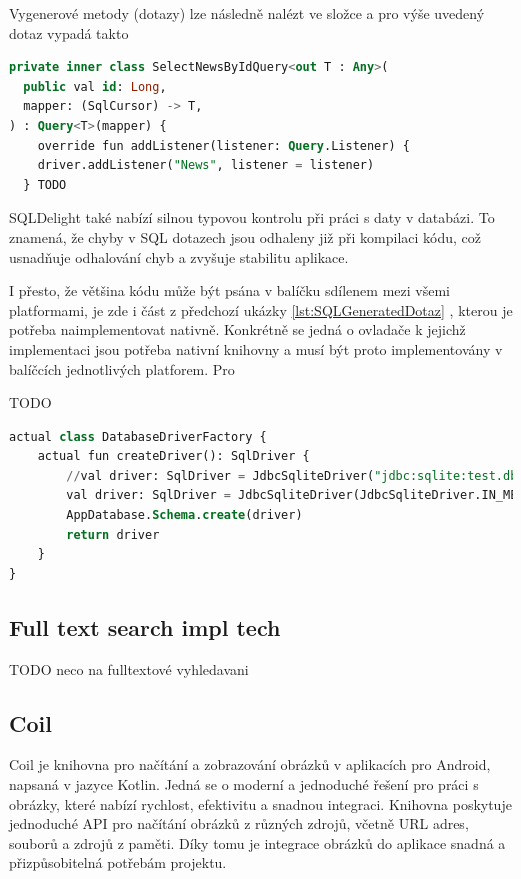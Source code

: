 Vygenerové metody (dotazy) lze následně nalézt ve složce \code{} a pro výše uvedený dotaz vypadá takto

\begin{lstlisting}[caption={SQL vygenerovaný dotaz}, label={lst:SQLGeneratedDotaz}, language=SQL]
private inner class SelectNewsByIdQuery<out T : Any>(
  public val id: Long,
  mapper: (SqlCursor) -> T,
) : Query<T>(mapper) {
    override fun addListener(listener: Query.Listener) {
    driver.addListener("News", listener = listener)
  } TODO
  \end{lstlisting}
  

SQLDelight také nabízí silnou typovou kontrolu při práci s daty v databázi. To znamená, že chyby v SQL dotazech jsou odhaleny již při
 kompilaci kódu, což usnadňuje odhalování chyb a zvyšuje stabilitu aplikace.

I přesto, že většina kódu může být psána v balíčku sdílenem mezi všemi platformami, je zde i část z předchozí ukázky \ref{lst:SQLGeneratedDotaz}
, kterou je potřeba naimplementovat nativně. Konkrétně se jedná o ovladače k jejichž implementaci jsou potřeba nativní knihovny a musí
být proto implementovány v balíčcích jednotlivých platforem. Pro 

TODO
\begin{lstlisting}[caption={SQL vygenerovaný dotaz}, label={lst:SQLGeneratedDotaz}, language=SQL]
  actual class DatabaseDriverFactory {
    actual fun createDriver(): SqlDriver {
        //val driver: SqlDriver = JdbcSqliteDriver("jdbc:sqlite:test.db")
        val driver: SqlDriver = JdbcSqliteDriver(JdbcSqliteDriver.IN_MEMORY)
        AppDatabase.Schema.create(driver)
        return driver
    }
}
\end{lstlisting}


\subsection{Full text search impl tech} \label{fulltextSearch}
TODO
 neco na fulltextové vyhledavani


\subsection{Coil}
Coil je knihovna pro načítání a zobrazování obrázků v aplikacích pro Android, napsaná v jazyce Kotlin. Jedná se o moderní a jednoduché 
řešení pro práci s obrázky, které nabízí rychlost, efektivitu a snadnou integraci. Knihovna poskytuje jednoduché API pro načítání obrázků 
z různých zdrojů, včetně URL adres, souborů a zdrojů z paměti. Díky tomu je integrace obrázků do aplikace snadná a přizpůsobitelná potřebám projektu.

